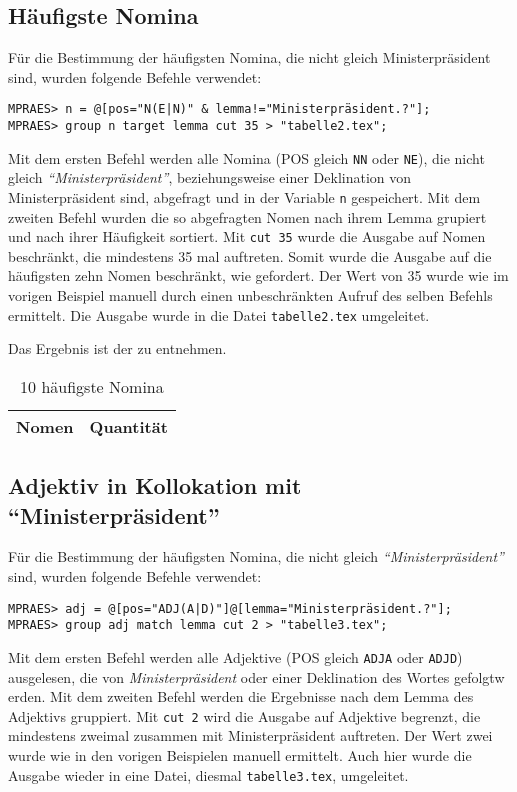 \documentclass[%
	type=document,%
  	style=article,%
  	media=print,
  	pages=oneside,%
  	prefixLecturer=Dozenten:,
  	author=multiple,
]{unihildesheim} %
\begin{document}
\subsection{Häufigste Nomina}
Für die Bestimmung der häufigsten Nomina, die nicht gleich Ministerpräsident
sind, wurden folgende Befehle verwendet:
\begin{Verbatim}[frame=single,label=CQP,commandchars=\\\{\}]
MPRAES> n = @[pos="N(E|N)" & lemma!="Ministerpräsident.?"];
MPRAES> group n target lemma cut 35 > "tabelle2.tex";
\end{Verbatim}

Mit dem ersten Befehl werden alle Nomina (POS gleich \texttt{NN} oder
\texttt{NE}), die nicht gleich \textit{"`Ministerpräsident"'}, beziehungsweise einer
Deklination von Ministerpräsident sind, abgefragt und in der Variable \texttt{n}
gespeichert. Mit dem zweiten Befehl wurden die so abgefragten Nomen nach ihrem Lemma grupiert und
nach ihrer Häufigkeit sortiert. Mit \texttt{cut 35} wurde die Ausgabe auf Nomen
beschränkt, die mindestens 35 mal auftreten. Somit wurde die Ausgabe auf die
häufigsten zehn Nomen beschränkt, wie gefordert. Der Wert von 35 wurde wie im
vorigen Beispiel manuell durch einen unbeschränkten Aufruf des selben
Befehls ermittelt. Die Ausgabe wurde in die Datei \texttt{tabelle2.tex}
umgeleitet.

Das Ergebnis ist der  zu entnehmen.
\begin{table}[htpb]\label{t}
	\center
	\begin{tabularx}{0.35\textwidth}{lr}
		\toprule
		\textbf{Nomen} & \textbf{Quantität}\\
		\midrule
		
		\bottomrule
	\end{tabularx}
	\caption{10 häufigste Nomina}
	\label{tab:nomina}
\end{table}

\subsection{Adjektiv in Kollokation mit "`Ministerpräsident"'}
Für die Bestimmung der häufigsten Nomina, die nicht gleich
\textit{"`Ministerpräsident"'} sind, wurden folgende Befehle verwendet:
\begin{Verbatim}[frame=single,label=CQP,commandchars=\\\{\}]
MPRAES> adj = @[pos="ADJ(A|D)"]@[lemma="Ministerpräsident.?"];
MPRAES> group adj match lemma cut 2 > "tabelle3.tex";
\end{Verbatim}
Mit dem ersten Befehl werden alle Adjektive (POS gleich \texttt{ADJA} oder
\texttt{ADJD}) ausgelesen, die von \textit{Ministerpräsident} oder einer
Deklination des Wortes gefolgtw erden. Mit dem zweiten Befehl werden die Ergebnisse nach dem Lemma des
Adjektivs gruppiert. Mit \texttt{cut 2} wird die Ausgabe auf Adjektive begrenzt,
die mindestens zweimal zusammen mit Ministerpräsident auftreten. Der Wert zwei
wurde wie in den vorigen Beispielen manuell ermittelt. Auch hier wurde die Ausgabe
wieder in eine Datei, diesmal \texttt{tabelle3.tex}, umgeleitet. 
\end{document}
